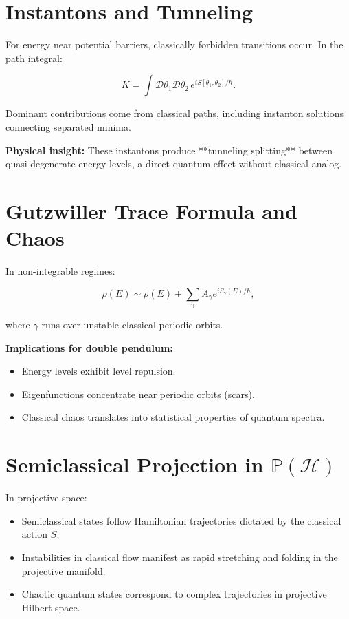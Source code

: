 \documentclass[11pt]{book}
\begin{document}
\section{Instantons and Tunneling}

For energy near potential barriers, classically forbidden transitions occur.  
In the path integral:

\[
K = \int \mathcal{D}\theta_1 \mathcal{D}\theta_2 \, e^{i S[\theta_1,\theta_2]/\hbar}.
\]

Dominant contributions come from classical paths, including 
instanton solutions connecting separated minima.  

\textbf{Physical insight:} These instantons produce **tunneling splitting** between quasi-degenerate energy levels, a direct quantum effect without classical analog.

\section{Gutzwiller Trace Formula and Chaos}

In non-integrable regimes:

\[
\rho(E) \sim \bar \rho(E) + \sum_{\gamma} A_\gamma e^{i S_\gamma(E)/\hbar},
\]

where $\gamma$ runs over unstable classical periodic orbits.

\textbf{Implications for double pendulum:}

\begin{itemize}
    \item Energy levels exhibit level repulsion.
    \item Eigenfunctions concentrate near periodic orbits (scars).
    \item Classical chaos translates into statistical properties of quantum spectra.
\end{itemize}

\section{Semiclassical Projection in $\mathbb{P}(\mathcal{H})$}

In projective space:

\begin{itemize}
    \item Semiclassical states follow Hamiltonian trajectories dictated by the classical action $S$.
    \item Instabilities in classical flow manifest as rapid stretching and folding in the projective manifold.
    \item Chaotic quantum states correspond to complex trajectories in projective Hilbert space.
\end{itemize}
\end{document}
